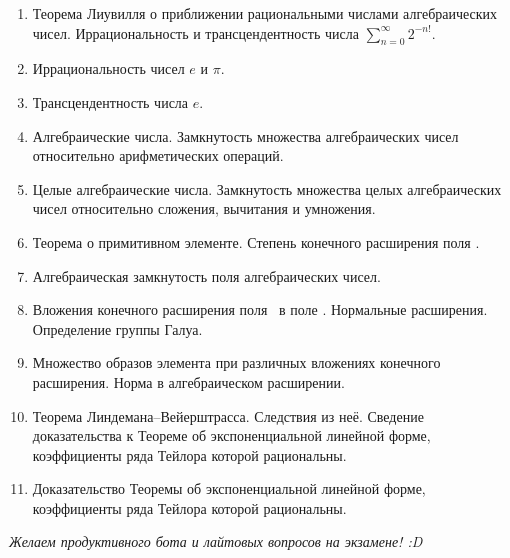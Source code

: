 \begin{enumerate}[%
  label={\arabic*.},%
  itemsep=4pt,%
  parsep=2pt%
]
        Теорема Дирихле о приближении действительных чисел рациональными. 
        Следствие для иррациональных чисел.
    \item  %
        Теорема Лиувилля о приближении рациональными числами алгебраических чисел. 
        Иррациональность и трансцендентность числа $\sum_{n=0}^{\infty} 2^{-n!}$.
    \item  %
        Иррациональность чисел $e$ и $\pi$.
    \item  %
        Трансцендентность числа $e$.
    \item  %
        Алгебраические числа. 
        Замкнутость множества алгебраических чисел относительно арифметических операций.
    \item  %
        Целые алгебраические числа. 
        Замкнутость множества целых алгебраических чисел относительно сложения, вычитания и умножения.
    \item  %
        Теорема о примитивном элементе. 
        Степень конечного расширения поля \QQ.
    \item  %
        Алгебраическая замкнутость поля алгебраических чисел.
    \item  %
        Вложения конечного расширения поля \QQ~в поле \CC. 
        Нормальные расширения. 
        Определение группы Галуа.
    \item  %
        Множество образов элемента при различных вложениях конечного расширения. 
        Норма в алгебраическом расширении.
    \item  %
        Теорема Линдемана--Вейерштрасса. 
        Следствия из неё. 
        Сведение доказательства к Теореме об экспоненциальной линейной форме, коэффициенты ряда Тейлора которой рациональны.
    \item  %
        Доказательство Теоремы об экспоненциальной линейной форме, коэффициенты ряда Тейлора которой рациональны.
\end{enumerate}

\vspace{1cm}

\begin{FlushRight}
    \small\itshape
    Желаем продуктивного бота и лайтовых вопросов на экзамене! :D
\end{FlushRight}


\restoregeometry
